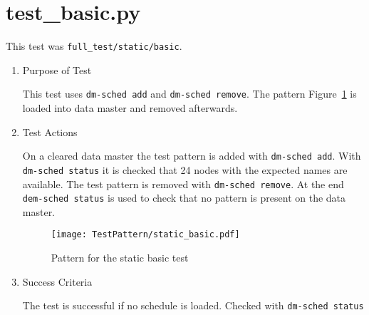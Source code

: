 \documentclass[12pt,a4paper]{report}
\begin{document}
\section{test\_basic.py}
This test was \texttt{full\_test/static/basic}.
\begin{enumerate}
  \item Purpose of Test

  This test uses \texttt{dm-sched add} and \texttt{dm-sched remove}. The pattern Figure~\ref{fig:Pattern_for_the_static_basic_test}
  is loaded into data master and removed afterwards.

  \item Test Actions

  On a cleared data master the test pattern is added with \texttt{dm-sched add}. With \texttt{dm-sched status} it is checked
  that 24 nodes with the expected names are available. The test pattern is removed with \texttt{dm-sched remove}. At the
  end \texttt{dem-sched status} is used to check that no pattern is present on the data master.

    \begin{figure}
        \centering
        \texttt{[image: TestPattern/static\_basic.pdf]}
        \caption{Pattern for the static basic test}
        \label{fig:Pattern_for_the_static_basic_test}
    \end{figure}
  \item Success Criteria

  The test is successful if no schedule is loaded. Checked with \texttt{dm-sched status}
\end{enumerate}
\end{document}
